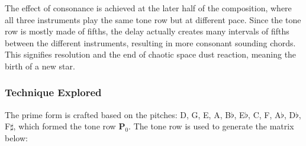 \documentclass{article}
\begin{document}
The effect of consonance is achieved at the later half of the composition,
where all three instruments play the same tone row but at different pace.
Since the tone row is mostly made of fifths, the delay actually creates many
intervals of fifths between the different instruments, resulting in more
consonant sounding chords. This signifies resolution and the end of chaotic
space dust reaction, meaning the birth of a new star.\\

\subsubsection{Technique Explored}

The prime form is crafted based on the pitches: D, G, E, A, B\(\flat\), E\(\flat\), C, F, A\(\flat\), D\(\flat\), F\(\sharp\), which formed the tone row \(\mathbf P_0\). The tone row is used to generate the matrix below:
\end{document}
